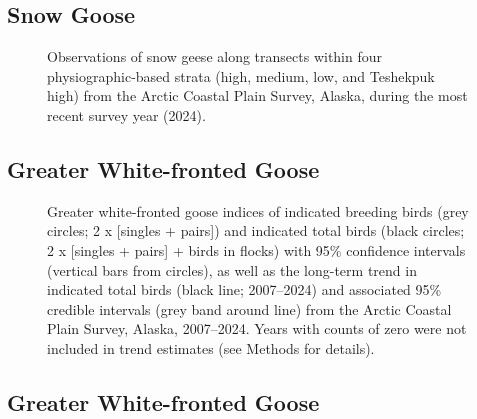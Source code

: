 \documentclass[
]{article}
\begin{document}
\endgroup{}

\newpage{}

\subsection*{Snow Goose}\label{snow-goose-2}

\begin{figure}


\caption{\label{fig-SNGOmap}Observations of snow geese along transects
within four physiographic-based strata (high, medium, low, and Teshekpuk
high) from the Arctic Coastal Plain Survey, Alaska, during the most
recent survey year (2024).}

\end{figure}%

\newpage{}

\subsection*{Greater White-fronted
Goose}\label{greater-white-fronted-goose}

\begin{figure}


\caption{\label{fig-GWFG}Greater white-fronted goose indices of
indicated breeding birds (grey circles; 2 x {[}singles + pairs{]}) and
indicated total birds (black circles; 2 x {[}singles + pairs{]} + birds
in flocks) with 95\% confidence intervals (vertical bars from circles),
as well as the long-term trend in indicated total birds (black line;
2007--2024) and associated 95\% credible intervals (grey band around
line) from the Arctic Coastal Plain Survey, Alaska, 2007--2024. Years
with counts of zero were not included in trend estimates (see Methods
for details).}

\end{figure}%

\newpage{}

\subsection*{Greater White-fronted
Goose}\label{greater-white-fronted-goose-1}
\end{document}
